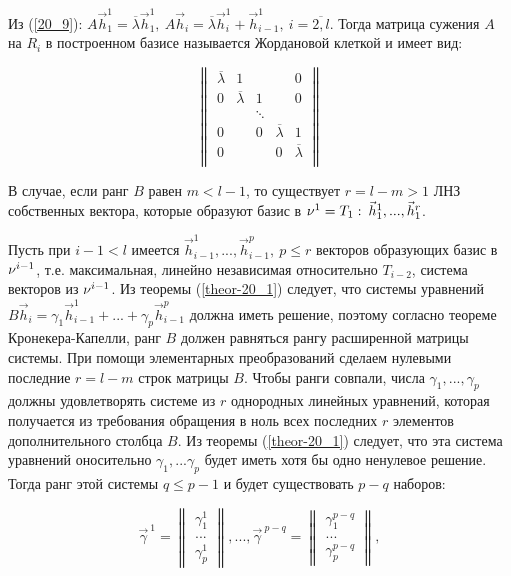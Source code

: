 \documentclass[a4paper, 12pt]{article}
\begin{document}
Из (\ref{20_9}): $A\vec{h}_1^1 = \overline{\lambda} \vec{h}_1^1, \: A\vec{h}_i = \overline{\lambda} \vec{h}_i^1 + \vec{h}_{i-1}^1, \: i = \overline{2,l}$. Тогда матрица сужения $A$ на $R_i$ в построенном базисе называется Жордановой клеткой и имеет вид:

\begin{equation*}
\begin{Vmatrix}
    \overline{\lambda} & 1 & & & 0 \\
    0 & \overline{\lambda} & 1 & & 0 \\
      & & \ddots & & \\
    0 & & 0 & \overline{\lambda} & 1 \\
    0 & & & 0 & \overline{\lambda} \\
\end{Vmatrix}
\end{equation*}

В случае, если ранг $B$ равен $m < l - 1$, то существует $r = l - m > 1$ ЛНЗ собственных вектора, которые образуют базис в $\nu^1 = T_1 : \: \vec{h}_1^1, ... , \vec{h}_1^r$.

Пусть при $i-1 < l$ имеется $\vec{h}_{i-1}^1, ... , \vec{h}_{i-1}^p, \: p \leq r$ векторов образующих базис в $\nu^{i-1}$, т.е. максимальная, линейно независимая относительно $T_{i-2}$, система векторов из $\nu^{i-1}$.  Из теоремы (\ref{theor-20_1}) следует, что системы уравнений $B\vec{h}_i = \gamma_1 \vec{h}_{i-1}^1 + ... + \gamma_p \vec{h}_{i-1}^p$ должна иметь решение, поэтому согласно теореме Кронекера-Капелли, ранг $B$ должен равняться рангу расширенной матрицы системы. При помощи элементарных преобразований сделаем нулевыми последние $r = l - m$ строк матрицы $B$. Чтобы ранги совпали, числа $\gamma_1, ... , \gamma_p$ должны удовлетворять системе из $r$ однородных линейных уравнений, которая получается из требования обращения в ноль всех последних $r$ элементов дополнительного столбца $B$. Из теоремы (\ref{theor-20_1}) следует, что эта система уравнений оносительно $\gamma_1, ... \gamma_p$ будет иметь хотя бы одно ненулевое решение. Тогда ранг этой системы $q \leq p - 1$ и будет существовать $p-q$ наборов:

\begin{equation*}
\vec{\gamma}^{\: 1} =
\begin{Vmatrix}
    \gamma_1^1 \\
    ...         \\
    \gamma_p^1
\end{Vmatrix}
, ... ,
\vec{\gamma}^{\: p-q} = 
\begin{Vmatrix}
    \gamma_1^{p-q} \\
    ...         \\
    \gamma_p^{p-q}
\end{Vmatrix}
,
\end{equation*} 
\end{document}
